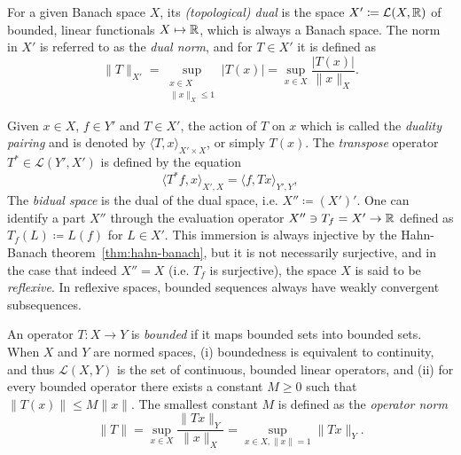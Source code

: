 \begin{definition}
    For a given Banach space $X$, its \emph{(topological) dual} is the space $X'\coloneqq \mathcal{L}(X,\mathbb{R})$ of bounded, linear functionals $X\mapsto \mathbb{R}$, which is always a Banach space. The norm in $X'$ is referred to as the \emph{dual norm}, and for $T\in X'$ it is defined as 
    \begin{equation}\label{eq:dual-norm}
        \|T\|_{X'} = \sup_{\substack{x\in X\\ \|x\|_X\leq 1}} |T(x)|= \sup_{x\in X}\frac{|T(x)|}{\|x\|_X}.
    \end{equation}
\end{definition}
\begin{definition}
    Given $x\in X$, $f\in Y'$ and $T\in X'$, the action of $T$ on $x$ which is called the \emph{duality pairing} and is denoted by $\langle T, x\rangle_{X'\times X}$, or simply $T(x)$. The \emph{transpose} operator $T^*\in \mathcal{L}(Y',X')$ is defined by the equation 
    \begin{equation}
        \langle T^* f, x\rangle_{X',X} = \langle f, Tx\rangle_{Y',Y},
    \end{equation}
    The \emph{bidual space} is the dual of the dual space, i.e. $X'' \coloneqq (X')'$. One can identify a part $X''$ through the evaluation operator $X''\ni T_f = X'\to \mathbb{R}$ defined as $T_f(L) \coloneqq L(f)$ for $L\in X'$. This immersion is always injective by the Hahn-Banach theorem~\ref{thm:hahn-banach}, but it is not necessarily surjective, and in the case that indeed $X''=X$ (i.e. $T_f$ is surjective), the space $X$ is said to be \emph{reflexive}. In reflexive spaces, bounded sequences always have weakly convergent subsequences. %
\end{definition}
\begin{definition}\label{def:bounded-operator}
    An operator $T:X\to Y$ is \emph{bounded} if it maps bounded sets into bounded sets. When $X$ and $Y$ are normed spaces, (i) boundedness is equivalent to continuity, and thus $\mathcal{L}(X,Y)$ is the set of continuous, bounded linear operators, and (ii) for every bounded operator there exists a constant $M\geq 0$ such that $\|T(x)\|\leq M\|x\|$. The smallest constant $M$ is defined as the \emph{operator norm}
    \begin{equation}\label{eq:operator-norm}
        \| T\| =  \sup_{x\in X}\frac{\|Tx\|_Y}{\|x\|_X} = \sup_{x\in X,\|x\|=1}\|Tx\|_Y.
    \end{equation}
\end{definition}
